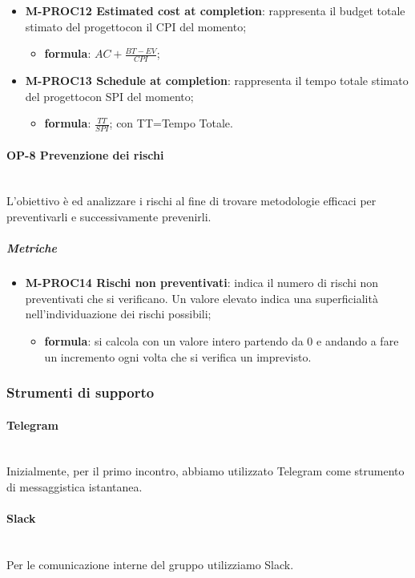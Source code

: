 \begin{itemize}
				\item \textbf{M-PROC12 Estimated cost at completion}: rappresenta il budget totale stimato del progetto\glosp con il CPI del momento;
				\begin{itemize}
					\item[] \textbf{formula}: $AC+\frac{BT-EV}{CPI}$; 
				\end{itemize} 
				
				\item \textbf{M-PROC13 Schedule at completion}: rappresenta il tempo totale stimato del progetto\glosp con SPI del momento;
				\begin{itemize}
					\item[] \textbf{formula}: $\frac{TT}{SPI}$; con TT=Tempo Totale. 
				\end{itemize} 
			\end{itemize}
		
			\paragraph{OP-8 Prevenzione dei rischi} \mbox{}\\ [1mm]
			L'obiettivo è ed analizzare i rischi al fine di trovare metodologie efficaci per preventivarli e successivamente prevenirli.
			\subparagraph{Metriche}
			\begin{itemize}
				\item \textbf{M-PROC14 Rischi non preventivati}: indica il numero di rischi non preventivati che si verificano. Un valore elevato indica una superficialità nell'individuazione dei rischi possibili;
				\begin{itemize}
					\item[] \textbf{formula}: si calcola con un valore intero partendo da 0 e andando a fare un incremento ogni volta che si verifica un imprevisto.
				\end{itemize}
			\end{itemize}
	\subsubsection{Strumenti di supporto}
			\paragraph{Telegram} \mbox{}\\ [1mm]
				Inizialmente, per il primo incontro, abbiamo utilizzato Telegram come strumento di messaggistica istantanea.
			\paragraph{Slack} \mbox{}\\ [1mm]
				Per le comunicazione interne del gruppo utilizziamo Slack.
